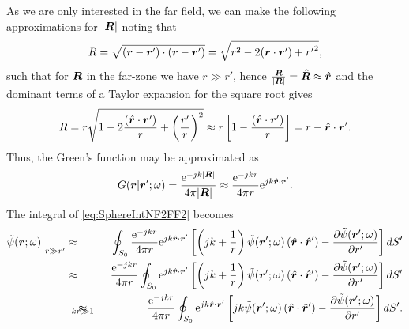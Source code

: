 \par As we are only interested in the far field, we can make the following approximations for $|\mbfit{R}|$ noting that
\begin{equation}
R = \sqrt{(\mbfit{r}-\mbfit{r'}) \cdot (\mbfit{r}-\mbfit{r'}) } = \sqrt{r^2  - 2 (\mbfit{r} \cdot \mbfit{r'}) + {r'}^2},
\end{equation} such that for $\mbfit{R}$ in the far-zone we have $r \gg r'$, hence $\frac{\mbfit{R}}{|\mbfit{R}|} = \hat{\mbfit{R}} \approx \hat{\mbfit{r}}$ and the dominant terms of a Taylor expansion for the square root gives
\begin{equation}
R = r \sqrt{1 - 2 \frac{(\hat{\mbfit{r}} \cdot \mbfit{r'})}{r} + {\left (\frac{r'}{r} \right )}^2} \approx r \left [ 1 - \frac{(\hat{\mbfit{r}} \cdot \mbfit{r'})}{r} \right ] = r - \hat{\mbfit{r}} \cdot \mbfit{r'}.
\end{equation} Thus, the Green's function may be approximated as
\begin{equation}
\label{eq:GrAppr}
G(\mbfit{r}|\mbfit{r'};\omega) = \frac{\mrm{e}^{-jk|\mbfit{R}|}}{4\pi|\mbfit{R}|} \approx \frac{\mrm{e}^{-jk r}}{4\pi r} \mrm{e}^{jk \hat{\mbfit{r}} \cdot \mbfit{r'}}.
\end{equation} The integral of \eqref{eq:SphereIntNF2FF2} becomes
\begin{eqnarray}
\label{eq:SphereIntNF2FF3}
\tilde{\psi}(\mbfit{r}; \omega) \Big{|}_{r \gg r'} &\approx & \oint_{S_0} \frac{\mrm{e}^{-jk r}}{4\pi r} \mrm{e}^{jk \hat{\mbfit{r}} \cdot \mbfit{r'}}  \left [ \left ( jk + \frac{1}{r} \right ) \tilde{\psi}(\mbfit{r'}; \omega)  \left (\hat{\mbfit{r}} \cdot \hat{\mbfit{r}}' \right ) - \frac{\partial{\tilde{\psi}(\mbfit{r'}; \omega)}}{\partial{r'}} \right ] dS' \nonumber \\
&\approx & \frac{\mrm{e}^{-jk r}}{4\pi r} \oint_{S_0}  \mrm{e}^{jk \hat{\mbfit{r}} \cdot \mbfit{r'}}  \left [ \left ( jk + \frac{1}{r} \right ) \tilde{\psi}(\mbfit{r'}; \omega)  \left ( \hat{\mbfit{r}} \cdot \hat{\mbfit{r}}'  \right )  -  \frac{\partial{\tilde{\psi}(\mbfit{r'}; \omega)}}{\partial{r'}} \right ] dS' \nonumber \\
& \begin{array}[t]{c}  \approx \\[-10pt] \scriptstyle {kr \gg 1} \end{array} & \frac{\mrm{e}^{-jk r}}{4\pi r} \oint_{S_0}  \mrm{e}^{jk \hat{\mbfit{r}} \cdot \mbfit{r'}}  \left [  jk  \tilde{\psi}(\mbfit{r'}; \omega)  \left ( \hat{\mbfit{r}} \cdot \hat{\mbfit{r}}'  \right )  -  \frac{\partial{\tilde{\psi}(\mbfit{r'}; \omega)}}{\partial{r'}} \right ] dS'.
\end{eqnarray}

